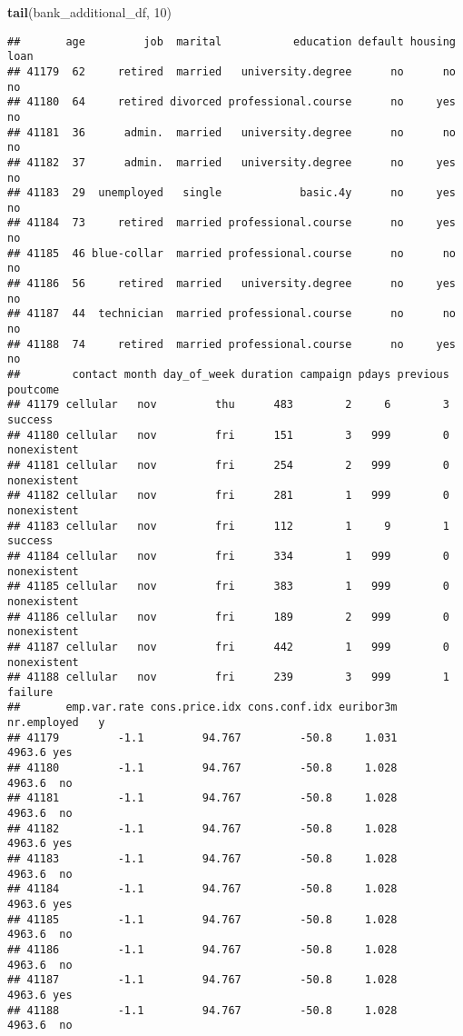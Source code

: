 \documentclass[
]{article}
\newenvironment{Shaded}{\begin{snugshade}}{\end{snugshade}}
\newcommand{\DecValTok}[1]{\textcolor[rgb]{0.00,0.00,0.81}{#1}}
\newcommand{\FunctionTok}[1]{\textcolor[rgb]{0.13,0.29,0.53}{\textbf{#1}}}
\newcommand{\NormalTok}[1]{#1}
\begin{document}
\begin{Shaded}
\begin{Highlighting}[]
\FunctionTok{tail}\NormalTok{(bank\_additional\_df, }\DecValTok{10}\NormalTok{)}
\end{Highlighting}
\end{Shaded}

\begin{verbatim}
##       age         job  marital           education default housing loan
## 41179  62     retired  married   university.degree      no      no   no
## 41180  64     retired divorced professional.course      no     yes   no
## 41181  36      admin.  married   university.degree      no      no   no
## 41182  37      admin.  married   university.degree      no     yes   no
## 41183  29  unemployed   single            basic.4y      no     yes   no
## 41184  73     retired  married professional.course      no     yes   no
## 41185  46 blue-collar  married professional.course      no      no   no
## 41186  56     retired  married   university.degree      no     yes   no
## 41187  44  technician  married professional.course      no      no   no
## 41188  74     retired  married professional.course      no     yes   no
##        contact month day_of_week duration campaign pdays previous    poutcome
## 41179 cellular   nov         thu      483        2     6        3     success
## 41180 cellular   nov         fri      151        3   999        0 nonexistent
## 41181 cellular   nov         fri      254        2   999        0 nonexistent
## 41182 cellular   nov         fri      281        1   999        0 nonexistent
## 41183 cellular   nov         fri      112        1     9        1     success
## 41184 cellular   nov         fri      334        1   999        0 nonexistent
## 41185 cellular   nov         fri      383        1   999        0 nonexistent
## 41186 cellular   nov         fri      189        2   999        0 nonexistent
## 41187 cellular   nov         fri      442        1   999        0 nonexistent
## 41188 cellular   nov         fri      239        3   999        1     failure
##       emp.var.rate cons.price.idx cons.conf.idx euribor3m nr.employed   y
## 41179         -1.1         94.767         -50.8     1.031      4963.6 yes
## 41180         -1.1         94.767         -50.8     1.028      4963.6  no
## 41181         -1.1         94.767         -50.8     1.028      4963.6  no
## 41182         -1.1         94.767         -50.8     1.028      4963.6 yes
## 41183         -1.1         94.767         -50.8     1.028      4963.6  no
## 41184         -1.1         94.767         -50.8     1.028      4963.6 yes
## 41185         -1.1         94.767         -50.8     1.028      4963.6  no
## 41186         -1.1         94.767         -50.8     1.028      4963.6  no
## 41187         -1.1         94.767         -50.8     1.028      4963.6 yes
## 41188         -1.1         94.767         -50.8     1.028      4963.6  no
\end{verbatim}
\end{document}
